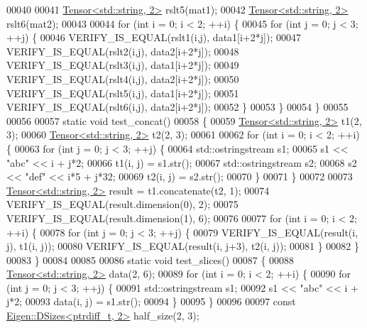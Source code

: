 \begin{DoxyCode}
00040 
00041   \hyperlink{class_eigen_1_1_tensor}{Tensor<std::string, 2>} rslt5(mat1);
00042   \hyperlink{class_eigen_1_1_tensor}{Tensor<std::string, 2>} rslt6(mat2);
00043 
00044   \textcolor{keywordflow}{for} (\textcolor{keywordtype}{int} i = 0; i < 2; ++i) \{
00045     \textcolor{keywordflow}{for} (\textcolor{keywordtype}{int} j = 0; j < 3; ++j) \{
00046       VERIFY\_IS\_EQUAL(rslt1(i,j), data1[i+2*j]);
00047       VERIFY\_IS\_EQUAL(rslt2(i,j), data2[i+2*j]);
00048       VERIFY\_IS\_EQUAL(rslt3(i,j), data1[i+2*j]);
00049       VERIFY\_IS\_EQUAL(rslt4(i,j), data2[i+2*j]);
00050       VERIFY\_IS\_EQUAL(rslt5(i,j), data1[i+2*j]);
00051       VERIFY\_IS\_EQUAL(rslt6(i,j), data2[i+2*j]);
00052     \}
00053   \}
00054 \}
00055 
00056 
00057 \textcolor{keyword}{static} \textcolor{keywordtype}{void} test\_concat()
00058 \{
00059   \hyperlink{class_eigen_1_1_tensor}{Tensor<std::string, 2>} t1(2, 3);
00060   \hyperlink{class_eigen_1_1_tensor}{Tensor<std::string, 2>} t2(2, 3);
00061 
00062   \textcolor{keywordflow}{for} (\textcolor{keywordtype}{int} i = 0; i < 2; ++i) \{
00063     \textcolor{keywordflow}{for} (\textcolor{keywordtype}{int} j = 0; j < 3; ++j) \{
00064       std::ostringstream s1;
00065       s1 << \textcolor{stringliteral}{"abc"} << i + j*2;
00066       t1(i, j) = s1.str();
00067       std::ostringstream s2;
00068       s2 << \textcolor{stringliteral}{"def"} << i*5 + j*32;
00069       t2(i, j) = s2.str();
00070     \}
00071   \}
00072 
00073   \hyperlink{class_eigen_1_1_tensor}{Tensor<std::string, 2>} result = t1.concatenate(t2, 1);
00074   VERIFY\_IS\_EQUAL(result.dimension(0), 2);
00075   VERIFY\_IS\_EQUAL(result.dimension(1), 6);
00076 
00077   \textcolor{keywordflow}{for} (\textcolor{keywordtype}{int} i = 0; i < 2; ++i) \{
00078     \textcolor{keywordflow}{for} (\textcolor{keywordtype}{int} j = 0; j < 3; ++j) \{
00079       VERIFY\_IS\_EQUAL(result(i, j),   t1(i, j));
00080       VERIFY\_IS\_EQUAL(result(i, j+3), t2(i, j));
00081     \}
00082   \}
00083 \}
00084 
00085 
00086 \textcolor{keyword}{static} \textcolor{keywordtype}{void} test\_slices()
00087 \{
00088   \hyperlink{class_eigen_1_1_tensor}{Tensor<std::string, 2>} data(2, 6);
00089   \textcolor{keywordflow}{for} (\textcolor{keywordtype}{int} i = 0; i < 2; ++i) \{
00090     \textcolor{keywordflow}{for} (\textcolor{keywordtype}{int} j = 0; j < 3; ++j) \{
00091       std::ostringstream s1;
00092       s1 << \textcolor{stringliteral}{"abc"} << i + j*2;
00093       data(i, j) = s1.str();
00094     \}
00095   \}
00096 
00097   \textcolor{keyword}{const} \hyperlink{struct_eigen_1_1_d_sizes}{Eigen::DSizes<ptrdiff\_t, 2>} half\_size(2, 3);

\end{DoxyCode}
